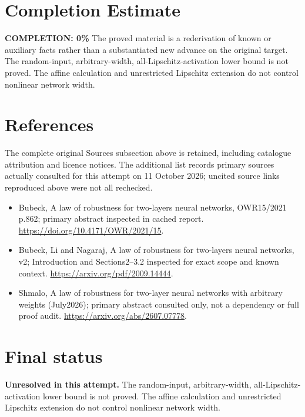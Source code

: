 \documentclass[11pt]{article}
\begin{document}
\section{Completion Estimate}
\noindent\textbf{COMPLETION: 0\%}
The proved material is a rederivation of known or auxiliary facts rather than a substantiated new advance on the original target. The random-input, arbitrary-width, all-Lipschitz-activation lower bound is not proved. The affine calculation and unrestricted Lipschitz extension do not control nonlinear network width.
\section{References}
The complete original Sources subsection above is retained, including catalogue attribution and licence notices. The additional list records primary sources actually consulted for this attempt on 11 October 2026; uncited source links reproduced above were not all rechecked.
\begin{itemize}
\item Bubeck, A law of robustness for two-layers neural networks, OWR15/2021 p.862; primary abstract inspected in cached report. \url{https://doi.org/10.4171/OWR/2021/15}.
\item Bubeck, Li and Nagaraj, A law of robustness for two-layers neural networks, v2; Introduction and Sections2–3.2 inspected for exact scope and known context. \url{https://arxiv.org/pdf/2009.14444}.
\item Shmalo, A law of robustness for two-layer neural networks with arbitrary weights (July2026); primary abstract consulted only, not a dependency or full proof audit. \url{https://arxiv.org/abs/2607.07778}.
\end{itemize}
\section{Final status}
\textbf{Unresolved in this attempt.} The random-input, arbitrary-width, all-Lipschitz-activation lower bound is not proved. The affine calculation and unrestricted Lipschitz extension do not control nonlinear network width.
\end{document}
